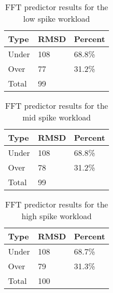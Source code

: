
\begin{table}[H]
\centering
\begin{tabular}{| l | l | l |}
\hline
Type & RMSD & Percent \\ \hline
Under & 108 & 68.8\% \\ \hline
Over & 77 & 31.2\% \\ \hline
Total & 99 & \\ \hline
\end{tabular}
\caption{FFT predictor results for the low spike workload}
\end{table}

\begin{table}[H]
\centering
\begin{tabular}{| l | l | l |}
\hline
Type & RMSD & Percent \\ \hline
Under & 108 & 68.8\% \\ \hline
Over & 78 & 31.2\% \\ \hline
Total & 99 & \\ \hline
\end{tabular}
\caption{FFT predictor results for the mid spike workload}
\end{table}

\begin{table}[H]
\centering
\begin{tabular}{| l | l | l |}
\hline
Type & RMSD & Percent \\ \hline
Under & 108 & 68.7\% \\ \hline
Over & 79 & 31.3\% \\ \hline
Total & 100 & \\ \hline
\end{tabular}
\caption{FFT predictor results for the high spike workload}
\end{table}